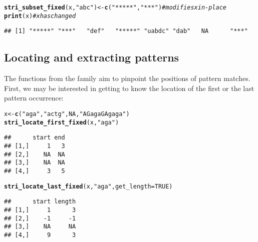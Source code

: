 \documentclass[nojss]{jss}\usepackage[]{graphicx}\usepackage[]{xcolor}
\makeatletter
\newcommand{\hlnum}[1]{\textcolor[rgb]{0.686,0.059,0.569}{#1}}%
\newcommand{\hlstr}[1]{\textcolor[rgb]{0.192,0.494,0.8}{#1}}%
\newcommand{\hlcom}[1]{\textcolor[rgb]{0.678,0.584,0.686}{\textit{#1}}}%
\newcommand{\hlstd}[1]{\textcolor[rgb]{0.345,0.345,0.345}{#1}}%
\newcommand{\hlkwb}[1]{\textcolor[rgb]{0.69,0.353,0.396}{#1}}%
\newcommand{\hlkwc}[1]{\textcolor[rgb]{0.333,0.667,0.333}{#1}}%
\newcommand{\hlkwd}[1]{\textcolor[rgb]{0.737,0.353,0.396}{\textbf{#1}}}%
\newenvironment{kframe}{%
 \def\at@end@of@kframe{}%
 \ifinner\ifhmode%
  \def\at@end@of@kframe{\end{minipage}}%
  \begin{minipage}{\columnwidth}%
 \fi\fi%
 \def\FrameCommand##1{\hskip\@totalleftmargin \hskip-\fboxsep
 \colorbox{shadecolor}{##1}\hskip-\fboxsep
     \hskip-\linewidth \hskip-\@totalleftmargin \hskip\columnwidth}%
 \MakeFramed {\advance\hsize-\width
   \@totalleftmargin\z@ \linewidth\hsize
   \@setminipage}}%
 {\par\unskip\endMakeFramed%
 \at@end@of@kframe}
\newenvironment{knitrout}{}{} %
\makeatother
\begin{document}
\begin{knitrout}
\color{fgcolor}\begin{kframe}
\begin{alltt}
\hlkwd{stri_subset_fixed}\hlstd{(x,} \hlstr{"abc"}\hlstd{)} \hlkwb{<-} \hlkwd{c}\hlstd{(}\hlstr{"*****"}\hlstd{,} \hlstr{"***"}\hlstd{)}  \hlcom{# modifies x in-place}
\hlkwd{print}\hlstd{(x)}  \hlcom{# x has changed}
\end{alltt}
\begin{verbatim}
## [1] "*****" "***"   "def"   "*****" "uabdc" "dab"   NA      "***"
\end{verbatim}
\end{kframe}
\end{knitrout}






\subsection{Locating and extracting patterns}

The functions from the  family
aim to pinpoint the positions of pattern matches.
First, we may be interested in getting to know the location of the
first or the last pattern occurrence:

\begin{knitrout}
\color{fgcolor}\begin{kframe}
\begin{alltt}
\hlstd{x} \hlkwb{<-} \hlkwd{c}\hlstd{(}\hlstr{"aga"}\hlstd{,} \hlstr{"actg"}\hlstd{,} \hlnum{NA}\hlstd{,} \hlstr{"AGagaGAgaga"}\hlstd{)}
\hlkwd{stri_locate_first_fixed}\hlstd{(x,} \hlstr{"aga"}\hlstd{)}
\end{alltt}
\begin{verbatim}
##      start end
## [1,]     1   3
## [2,]    NA  NA
## [3,]    NA  NA
## [4,]     3   5
\end{verbatim}
\begin{alltt}
\hlkwd{stri_locate_last_fixed}\hlstd{(x,} \hlstr{"aga"}\hlstd{,} \hlkwc{get_length}\hlstd{=}\hlnum{TRUE}\hlstd{)}
\end{alltt}
\begin{verbatim}
##      start length
## [1,]     1      3
## [2,]    -1     -1
## [3,]    NA     NA
## [4,]     9      3
\end{verbatim}
\end{kframe}
\end{knitrout}
\end{document}
